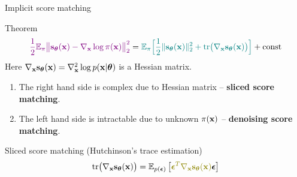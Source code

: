 \documentclass{beamer}
\begin{document}
\begin{frame}{Implicit score matching}
	\vspace{-0.3cm}
	\begin{block}{Theorem}
		\vspace{-0.6cm}
		\[
		{\color{violet}\frac{1}{2} \mathbb{E}_{\pi}\bigl\| \mathbf{s}_{\boldsymbol{\theta}}(\mathbf{x}) - \nabla_{\mathbf{x}} \log \pi(\mathbf{x}) \bigr\|^2_2} = {\color{teal}\mathbb{E}_{\pi}\Bigr[ \frac{1}{2}\| \mathbf{s}_{\boldsymbol{\theta}}(\mathbf{x}) \|_2^2 + \text{tr}\bigl(\nabla_{\mathbf{x}} \mathbf{s}_{\boldsymbol{\theta}}(\mathbf{x})\bigr) \Bigr]} + \text{const}
		\]
		Here $\nabla_{\mathbf{x}} \mathbf{s}_{\boldsymbol{\theta}}(\mathbf{x}) = \nabla_{\mathbf{x}}^2 \log p(\mathbf{x} | \boldsymbol{\theta})$ is a Hessian matrix.
	\end{block}
	\begin{enumerate}
		\item {\color{teal}The right hand side} is complex due to Hessian matrix -- \textbf{sliced score matching}.
		\item {\color{violet}The left hand side} is intractable due to unknown $\pi(\mathbf{x})$ -- \textbf{denoising score matching}. 
	\end{enumerate}
	\begin{block}{Sliced score matching (Hutchinson's trace estimation)}
	\vspace{-0.3cm}
	\[
		\text{tr}\bigl(\nabla_{\bx} \bs_{\btheta}(\bx)\bigr) = \mathbb{E}_{p(\bepsilon)} \left[ {\color{olive}\bepsilon^T \nabla_{\bx} \bs_{\btheta}(\bx)} \bepsilon \right]
	\]
	\end{block}
\end{frame}
\end{document}
